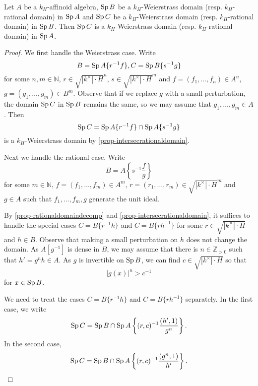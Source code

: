 \begin{proposition}\label{prop-rationaldomaintransitive}
    Let $A$ be a $k_H$-affinoid algebra, $\operatorname{Sp} B$ be a $k_H$-Weierstrass domain (resp. $k_H$-rational domain) in $\operatorname{Sp} A$ and $\operatorname{Sp} C$ be a $k_H$-Weierstrass domain (resp. $k_H$-rational domain) in $\operatorname{Sp} B$. Then $\operatorname{Sp} C$ is a $k_H$-Weierstrass domain (resp. $k_H$-rational domain) in $\operatorname{Sp} A$.
\end{proposition}
\begin{proof}
    We first handle the Weierstrass case.
    Write 
    \[
        B=\operatorname{Sp} A\{r^{-1}f\},   C=\operatorname{Sp} B\{s^{-1}g\}
    \]
    for some $n,m\in \mathbb{N}$, $r\in \sqrt{|k^{\times}|\cdot H}^n$, $s\in \sqrt{|k^{\times}|\cdot H}^m$ and $f=(f_1,\ldots,f_n)\in A^n$, $g=(g_1,\ldots,g_m)\in B^m$. Observe that if we replace $g$ with a small perturbation, the domain $\operatorname{Sp} C$ in $\operatorname{Sp} B$ remains the same, so we may assume that $g_1,\ldots,g_m\in A$. Then
    \[
        \operatorname{Sp} C=\operatorname{Sp} A\{r^{-1}f\}\cap \operatorname{Sp} A\{s^{-1}g\}
    \]
    is a $k_H$-Weierstrass domain by \cref{prop-intersecrationaldomain}.

    Next we handle the rational case. Write
    \[
        B=A\left\{s^{-1}\frac{f}{g}\right\}
    \]
    for some $m\in \mathbb{N}$, $f=(f_1,\ldots,f_m)\in A^m$, $r=(r_1,\ldots,r_m)\in \sqrt{|k^{\times}|\cdot H}^m$ and $g\in A$ such that $f_1,\ldots,f_m,g$ generate the unit ideal.

    By \cref{prop-rationaldomaindecomp} and \cref{prop-intersecrationaldomain}, it suffices to handle the special cases $C=B\{r^{-1}h\}$ and $C=B\{rh^{-1}\}$ for some $r\in \sqrt{|k^{\times}|\cdot H}$ and $h\in B$. Observe that making a small perturbation on $h$ does not change the domain.
    As $A[g^{-1}]$ is dense in $B$, we may assume that there is $n\in \mathbb{Z}_{>0}$ such that $h'=g^nh\in A$. As $g$ is invertible on $\operatorname{Sp} B$, we can find $c\in \sqrt{|k^{\times}|\cdot H}$ so that
    \[
        |g(x)|^n>c^{-1}  
    \]
    for $x\in \operatorname{Sp} B$. 
    
    We need to treat the cases $C=B\{r^{-1}h\}$ and $C=B\{rh^{-1}\}$ separately. In the first case, we write
    \[
        \operatorname{Sp} C=\operatorname{Sp} B\cap \operatorname{Sp} A\left\{ (r,c)^{-1}\frac{(h',1)}{g^n}\right\}.  
    \]
    In the second case,
    \[
        \operatorname{Sp} C=\operatorname{Sp} B\cap \operatorname{Sp} A\left\{(r,c)^{-1}\frac{(g^n,1)}{h'} \right\}.  
    \]
\end{proof}

